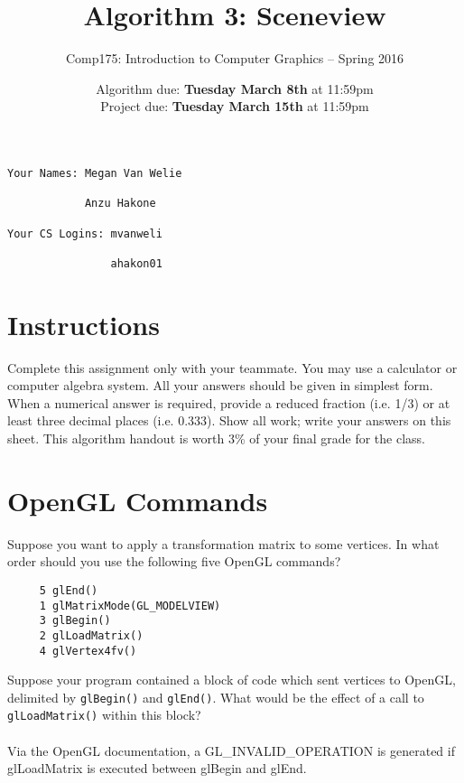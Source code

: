 \documentclass[10pt,twocolumn]{article}
\title{\Huge{\bf Algorithm 3: Sceneview}}
\author{Comp175: Introduction to Computer Graphics -- Spring 2016}
\date{Algorithm due:  {\bf Tuesday March 8th} at 11:59pm\\
Project due:  {\bf Tuesday March 15th} at 11:59pm}
\begin{document}
\maketitle

\begin{verbatim}
Your Names: Megan Van Welie

            Anzu Hakone

Your CS Logins: mvanweli

                ahakon01
\end{verbatim}


\section{Instructions}
Complete this assignment only with your teammate. You may use a
calculator or computer algebra system. All your answers should be given in simplest form.
When a numerical answer is required, provide a reduced fraction (i.e. 1/3) or at least three
decimal places (i.e. 0.333). Show all work; write your answers on this sheet. This algorithm handout is worth 3\% of your final grade for the class.

\section{OpenGL Commands}
\begin{framed}
 Suppose you want to apply a transformation matrix to some vertices. In what order should you use the following five OpenGL commands?
\begin{verbatim}
     5 glEnd()
     1 glMatrixMode(GL_MODELVIEW)
     3 glBegin()
     2 glLoadMatrix()
     4 glVertex4fv()
\end{verbatim}
\end{framed}


\begin{framed}
 Suppose your program contained a block of code which sent vertices to OpenGL, delimited by {\tt glBegin()} and {\tt glEnd()}. What would be the effect of a call to {\tt glLoadMatrix()} within this block?
\\ \\
Via the OpenGL documentation, a GL\_INVALID\_OPERATION is generated if glLoadMatrix is executed between glBegin and glEnd.
\end{framed}
\end{document}
